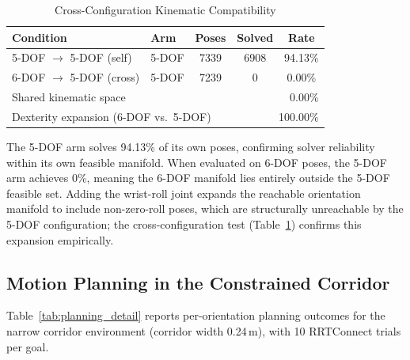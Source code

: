 \documentclass[conference]{IEEEtran}
\begin{document}
	\begin{table}[t]
		\centering
		\caption{Cross-Configuration Kinematic Compatibility}
		\label{tab:cross_config}
		\renewcommand{\arraystretch}{1.2}
		\small
		\begin{tabular}{llccc}
			\toprule
			\textbf{Condition} & \textbf{Arm} & \textbf{Poses} & \textbf{Solved} & \textbf{Rate} \\
			\midrule
			5-DOF $\rightarrow$ 5-DOF (self)  & 5-DOF & 7339 & 6908 & 94.13\% \\
			6-DOF $\rightarrow$ 5-DOF (cross) & 5-DOF & 7239 &    0 &  0.00\% \\
			\midrule
			\multicolumn{3}{l}{Shared kinematic space}                  & \multicolumn{2}{r}{0.00\%}   \\
			\multicolumn{3}{l}{Dexterity expansion (6-DOF vs.\ 5-DOF)} & \multicolumn{2}{r}{100.00\%} \\
			\bottomrule
		\end{tabular}
	\end{table}
	
	The 5-DOF arm solves 94.13\% of its own poses, confirming solver
	reliability within its own feasible manifold. When evaluated on 6-DOF
	poses, the 5-DOF arm achieves 0\%, meaning the 6-DOF manifold lies
	entirely outside the 5-DOF feasible set. Adding the wrist-roll joint
	expands the reachable orientation manifold to include non-zero-roll
	poses, which are structurally unreachable by the 5-DOF configuration;
	the cross-configuration test (Table~\ref{tab:cross_config}) confirms
	this expansion empirically.
	
	\subsection{Motion Planning in the Constrained Corridor}
	
	Table~\ref{tab:planning_detail} reports per-orientation planning
	outcomes for the narrow corridor environment (corridor width 0.24\,m),
	with 10 RRTConnect trials per goal.
	
\end{document}
